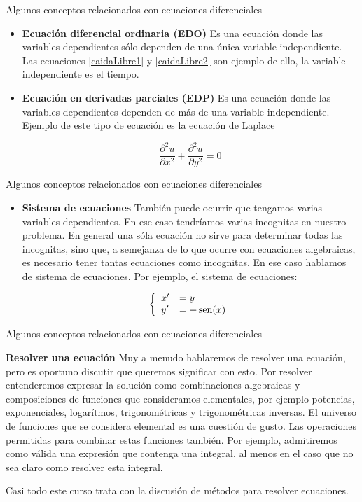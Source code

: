 \documentclass[handout,hyperref={colorlinks=true}]{beamer}
\DeclareMathOperator{\sen}{sen}
\newcommand{\nl}{\onslide<+-> }
\begin{document}
\begin{frame}{Algunos conceptos relacionados con ecuaciones diferenciales}
\begin{itemize}
\nl  \item \textbf{Ecuación diferencial ordinaria (EDO)} Es una ecuación donde las variables dependientes sólo dependen de una única variable independiente. Las 
ecuaciones \eqref{caidaLibre1} y \eqref{caidaLibre2} son ejemplo de ello, la variable independiente es el tiempo.
\nl  \item \textbf{Ecuación en derivadas parciales (EDP)} Es una ecuación donde las variables dependientes dependen de más de una variable independiente. 
Ejemplo de este tipo de ecuación es la ecuación de Laplace

\[\frac{\partial^2 u}{\partial x^2}+\frac{\partial^2 u}{\partial y^2}=0\]

\end{itemize}
\end{frame}

\begin{frame}{Algunos conceptos relacionados con ecuaciones diferenciales}
\begin{itemize}
\nl  \item \textbf{Sistema de ecuaciones} También puede ocurrir  que tengamos varias variables dependientes. En ese caso tendríamos varias incognitas en 
nuestro problema. En general una sóla ecuación no sirve para determinar todas las incognitas, sino que, a semejanza de lo que ocurre con ecuaciones algebraicas, es 
necesario tener tantas ecuaciones como incognitas. En ese caso hablamos de sistema de ecuaciones. Por ejemplo, el sistema de ecuaciones: 

\[\left\{ \begin{array}{l l} x'&=y \\y'&=-\sen(x) \end{array}\right.\]


\end{itemize}

 

\end{frame}


\begin{frame}{Algunos conceptos relacionados con ecuaciones diferenciales}
 
\nl  \textbf{Resolver una ecuación} Muy a menudo hablaremos de resolver una ecuación, pero es oportuno discutir que queremos significar con esto.  
Por resolver entenderemos expresar la solución como combinaciones algebraicas y composiciones de funciones que consideramos elementales, por ejemplo potencias, exponenciales, logarítmos, trigonométricas
y trigonométricas inversas. El universo de funciones que se considera elemental es una cuestión de gusto. Las operaciones permitidas para combinar estas funciones
también. Por ejemplo, admitiremos como válida una expresión que contenga una integral, al menos en el caso que no sea claro como resolver esta integral.

\nl Casi todo este curso trata con la discusión de métodos para resolver ecuaciones.
 

\end{frame}
\end{document}
